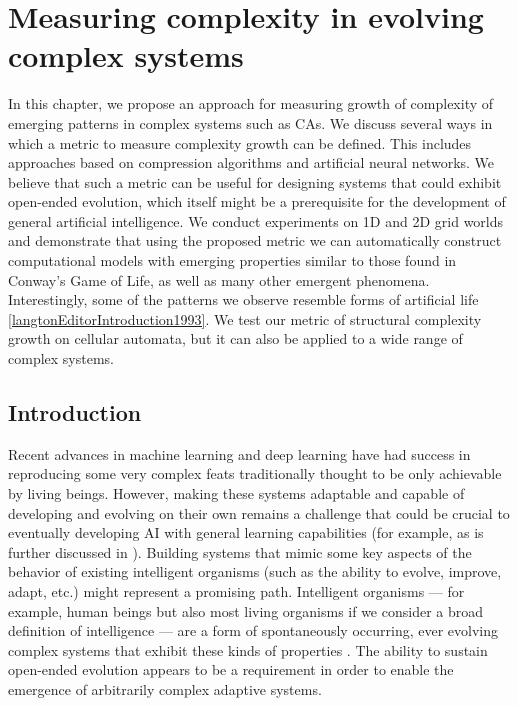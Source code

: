 \chapter{Measuring complexity in evolving complex systems}
\label{cha:meas-compl-evolv}

In this chapter, we propose an approach for measuring growth of complexity of
emerging patterns in complex systems such as \acfp{CA}. We discuss several ways
in which a metric to measure complexity growth can be defined. This includes
approaches based on compression algorithms and artificial neural networks. We
believe that such a metric can be useful for designing systems that could exhibit
open-ended evolution, which itself might be a prerequisite for the development of
general artificial intelligence. We conduct experiments on 1D and 2D grid worlds
and demonstrate that using the proposed metric we can automatically construct
computational models with emerging properties similar to those found in
Conway's Game of Life, as well as many other emergent phenomena. Interestingly,
some of the patterns we observe resemble forms of artificial life 
\ref{langtonEditorIntroduction1993}. We test our
metric of structural complexity growth on cellular automata, but it can also be
applied to a wide range of complex systems.

\section{Introduction}
Recent advances in machine learning and deep learning have had success in
reproducing some very complex feats traditionally thought to be only achievable
by living beings. However, making these systems adaptable and capable of
developing and evolving on their own remains a challenge that could be crucial to eventually developing AI with general learning capabilities (for example, as
is further discussed in \parencite{mikolovRoadmapMachineIntelligence2018}).
Building systems that mimic some key aspects of the behavior of existing
intelligent organisms (such as the ability to evolve, improve, adapt, etc.)
might represent a promising path. Intelligent organisms --- for example, human beings but
also most living organisms if we consider a broad definition of intelligence ---
are a form of spontaneously occurring, ever evolving complex systems that
exhibit these kinds of properties
\parencite{bookerPerspectivesAdaptationNatural2004}. The ability to sustain
open-ended evolution appears to be a requirement in order to enable the emergence of
arbitrarily complex adaptive systems.

